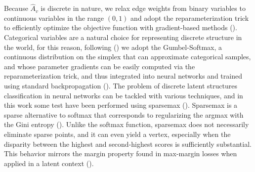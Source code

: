 \documentclass[binding=0.6cm]{sapthesis}
\newcommand{\mycite}[1]{(\cite{#1})}
\begin{document}
Because $\hat{A}_v$ is discrete in nature, we relax edge weights from binary variables to continuous variables in the range $(0, 1)$ and adopt the reparameterization trick to efficiently optimize the objective function with gradient-based methods \mycite{jang2017-gumbel}. Categorical variables are a natural choice for representing discrete structure in the
world, for this reason, following \mycite{luo2020-pgexplainer} we adopt the Gumbel-Softmax, a continuous distribution on the simplex that can approximate categorical samples, and whose parameter gradients can be easily computed via the reparameterization trick, and thus integrated into neural networks and trained using standard backpropagation \mycite{niculae2023-discrete}. The problem of discrete latent structures classification in neural networks can be tackled with various techniques, and in this work some test have been performed using sparsemax \mycite{martins2016-sparsemax}. Sparsemax is a sparse alternative to softmax that corresponds to regularizing the argmax with the Gini entropy \mycite{ross2007-intro-prob}. 
Unlike the softmax function, sparsemax does not necessarily eliminate sparse points, and it can even yield a vertex, especially when the disparity between the highest and second-highest scores is sufficiently substantial. This behavior mirrors the margin property found in max-margin losses when applied in a latent context \mycite{blondel2020-fenchel-young,niculae2023-discrete}.


\end{document}
